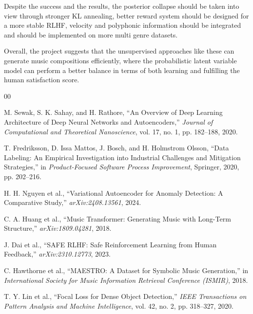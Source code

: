 \documentclass[conference]{IEEEtran}
\begin{document}
Despite the success and the results, the posterior collapse should be taken into view through stronger KL annealing, better reward system should be designed for a more stable RLHF, velocity and polyphonic information should be integrated and should be implemented on more multi genre datasets.

Overall, the project suggests that the unsupervised approaches like these can generate music compositions efficiently, where the probabilistic latent variable model can perform a better balance in terms of both learning and fulfilling the human satisfaction score.

\begin{thebibliography}{00}

 M. Sewak, S. K. Sahay, and H. Rathore, ``An Overview of Deep Learning Architecture of Deep Neural Networks and Autoencoders,'' \emph{Journal of Computational and Theoretical Nanoscience}, vol. 17, no. 1, pp. 182--188, 2020.

 T. Fredriksson, D. Issa Mattos, J. Bosch, and H. Holmstrom Olsson, ``Data Labeling: An Empirical Investigation into Industrial Challenges and Mitigation Strategies,'' in \emph{Product-Focused Software Process Improvement}, Springer, 2020, pp. 202--216.

 H. H. Nguyen et al., ``Variational Autoencoder for Anomaly Detection: A Comparative Study,'' \emph{arXiv:2408.13561}, 2024.

 C. A. Huang et al., ``Music Transformer: Generating Music with Long-Term Structure,'' \emph{arXiv:1809.04281}, 2018.

 J. Dai et al., ``SAFE RLHF: Safe Reinforcement Learning from Human Feedback,'' \emph{arXiv:2310.12773}, 2023.

 C. Hawthorne et al., ``MAESTRO: A Dataset for Symbolic Music Generation,'' in \emph{International Society for Music Information Retrieval Conference (ISMIR)}, 2018.

 T. Y. Lin et al., ``Focal Loss for Dense Object Detection,'' \emph{IEEE Transactions on Pattern Analysis and Machine Intelligence}, vol. 42, no. 2, pp. 318--327, 2020.

\end{thebibliography}
\end{document}
